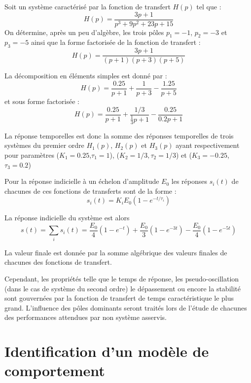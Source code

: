 Soit un système caractérisé par la fonction de transfert $H(p)$ tel
que :
$$
H(p)=\dfrac{3p+1}{p^3+9p^2+23p+15}
$$
On détermine, après un peu d'algèbre, les trois pôles 
$p_1=-1$, $p_2=-3$ et $p_3=-5$ ainsi que la forme factorisée de la fonction 
de transfert :
$$
H(p)=\dfrac{3p+1}{(p+1)(p+3)(p+5)}
$$

La décomposition en éléments simples est donné par :
$$
H(p)=\dfrac{0.25}{p+1}+\dfrac{1}{p+3}-\dfrac{1.25}{p+5}
$$
et sous forme factorisée :
$$
H(p)=\dfrac{0.25}{p+1}+\dfrac{1/3}{\frac{1}{3}p+1}-\dfrac{0.25}{0.2p+1}
$$

La réponse temporelles est donc la somme des réponses temporelles de trois 
systèmes du premier ordre $H_1(p)$, $H_2(p)$ et $H_3(p) $ ayant 
respectivement pour paramètres ($K_1=0.25$,$\tau_1=1$), 
($K_2=1/3,$$\tau_2=1/3$) et ($K_3=-0.25$,$\tau_3=0.2$)

Pour la réponse indicielle à un échelon d'amplitude $E_0$ les 
réponses $s_i(t)$ de chacunes de ces fonctions de transferts sont de la 
forme :
$$
s_i(t)=K_iE_0\left(1-e^{-t/\tau_i}\right)
$$

La réponse indicielle du système est alors
$$
s(t)=\sum_i s_i(t) = 
\dfrac{E_0}{4}\left(1-e^{-t}\right)+
\dfrac{E_0}{3}\left(1-e^{-3t}\right)-
\dfrac{E_0}{4}\left(1-e^{-5t}\right)
$$

La valeur finale est donnée par la somme algébrique des valeurs finales de 
chacunes des fonctions de transfert.

Cependant, les propriétés telle que le temps de réponse, 
les pseudo-oscillation (dans le cas de système du second ordre) 
le dépassement ou encore la stabilité sont gouvernées 
par la fonction de transfert de temps caractéristique le plus grand. 
L'influence des pôles dominants seront traités lors de l'étude 
de chacunes des performances attendues par non système asservis.


\newpage

\section{Identification d'un modèle de comportement}


